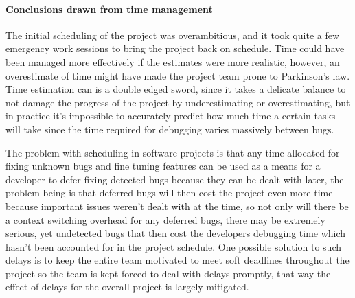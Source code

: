 \paragraph{Conclusions drawn from time management}
The initial scheduling of the project was overambitious, and it took quite a few emergency work sessions to bring the project back on schedule. Time could have been managed more effectively if the estimates were more realistic, however, an overestimate of time might have made the project team prone to Parkinson's law. \cite{bryan1967parkinson} Time estimation can is a double edged sword, since it takes a delicate balance to not damage the progress of the project by underestimating or overestimating, but in practice it's impossible to accurately predict how much time a certain tasks will take since the time required for debugging varies massively between bugs. 

The problem with scheduling in software projects is that any time allocated for fixing unknown bugs and fine tuning features can be used as a means for a developer to defer fixing detected bugs because they can be dealt with later, the problem being is that deferred bugs will then cost the project even more time because important issues weren't dealt with at the time, so not only will there be a context switching overhead for any deferred bugs, there may be extremely serious, yet undetected bugs that then cost the developers debugging time which hasn't been accounted for in the project schedule. \cite{bryan1967parkinson} One possible solution to such delays is to keep the entire team motivated to meet soft deadlines throughout the project so the team is kept forced to deal with delays promptly, that way the effect of delays for the overall project is largely mitigated. 

